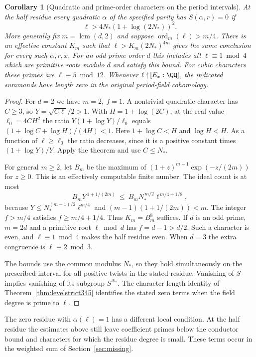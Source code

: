 \documentclass[a4paper,11pt]{article}
\newtheorem{corollary}[proposition]{Corollary}
\theoremstyle{definition}
\theoremstyle{remark}
\numberwithin{equation}{section}
\begin{document}
\begin{corollary}[Quadratic and prime-order characters on the period intervals]\leavevmode
\label{cor:fixedcollision457}
At the half residue every quadratic \(\alpha\) of the specified
parity has \(S(\alpha,r)=0\) if
\[
                   \ell>4N_*(1+\log(2N_*))^2 .
\]
More generally fix \(m=\operatorname{lcm}(d,2)\) and suppose
\(\operatorname{ord}_m(\ell)>m/4\). There is an effective constant
\(K_m\) such that \(\ell>K_m(2N_*)^{4m}\) gives the same
conclusion for every such \(\alpha,r,x\). For an odd prime
order \(d\) this includes all \(\ell\equiv1\bmod4\) which
are primitive roots modulo \(d\) and satisfy this bound.
For cubic characters these primes are \(\ell\equiv5\bmod12\).
Whenever \(\ell\nmid[E_x:\QQ]\), the indicated summands have
length zero in the original period-field cohomology.
\end{corollary}
\begin{proof}
For \(d=2\) we have \(m=2,\ f=1\). A nontrivial quadratic
character has \(C\ge3\), so \(Y=\sqrt{C\ell}/2>1\).
With \(H=1+\log(2C)\), at the real value \(\ell_0=4CH^2\)
the ratio \(Y(1+\log Y)/\ell_0\) equals
\((1+\log C+\log H)/(4H)<1\). Here \(1+\log C<H\) and
\(\log H<H\). As a function of \(\ell\ge\ell_0\) the ratio
decreases, since it is a positive constant times
\((1+\log Y)/Y\). Apply the theorem and use \(C\le N_*\).

For general \(m\ge2\), let \(B_m\) be the maximum of
\((1+z)^{m-1}\exp(-z/(2m))\) for \(z\ge0\). This is an
effectively computable finite number. The ideal count is at most
\[
 B_mY^{\,1+1/(2m)}
          \ \le\ B_m N_*^{\,m/2}\ell^{\,m/4+1/8},
\]
because \(Y\le N_*^{(m-1)/2}\ell^{m/4}\) and
\((m-1)(1+1/(2m))<m\). The integer \(f>m/4\) satisfies
\(f\ge m/4+1/4\). Thus \(K_m=B_m^8\) suffices. If \(d\) is
an odd prime, \(m=2d\) and a primitive root \(\ell\bmod d\)
has \(f=d-1>d/2\). Such a character is even, and
\(\ell\equiv1\bmod4\) makes the half residue even. When \(d=3\)
the extra congruence is \(\ell\equiv2\bmod3\).

The bounds use the common modulus \(N_*\), so they hold
simultaneously on the prescribed interval for all positive
twists in the stated residue. Vanishing of \(S\) implies
vanishing of its subgroup \(S^{N_*}\). The character length
identity of Theorem~\ref{thm:levelstrict345} identifies the
stated zero terms when the field degree is prime to \(\ell\).
\end{proof}

The zero residue with \(\alpha(\ell)=1\) has a different local
condition. At the half residue the estimates above still leave
coefficient primes below the conductor bound and characters for
which the residue degree is small. These terms occur in the
weighted sum of Section~\ref{sec:missing}.
\end{document}
